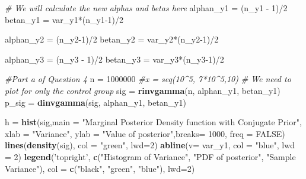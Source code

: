 \documentclass[]{article}
\newenvironment{Shaded}{\begin{snugshade}}{\end{snugshade}}
\newcommand{\KeywordTok}[1]{\textcolor[rgb]{0.13,0.29,0.53}{\textbf{{#1}}}}
\newcommand{\DataTypeTok}[1]{\textcolor[rgb]{0.13,0.29,0.53}{{#1}}}
\newcommand{\DecValTok}[1]{\textcolor[rgb]{0.00,0.00,0.81}{{#1}}}
\newcommand{\StringTok}[1]{\textcolor[rgb]{0.31,0.60,0.02}{{#1}}}
\newcommand{\CommentTok}[1]{\textcolor[rgb]{0.56,0.35,0.01}{\textit{{#1}}}}
\newcommand{\OtherTok}[1]{\textcolor[rgb]{0.56,0.35,0.01}{{#1}}}
\newcommand{\NormalTok}[1]{{#1}}
\begin{document}
\begin{Shaded}
\begin{Highlighting}[]
\CommentTok{# We will calculate the new alphas and betas here}
\NormalTok{alphan_y1 =}\StringTok{ }\NormalTok{(n_y1 -}\StringTok{ }\DecValTok{1}\NormalTok{)/}\DecValTok{2}
\NormalTok{betan_y1 =}\StringTok{ }\NormalTok{var_y1*(n_y1}\DecValTok{-1}\NormalTok{)/}\DecValTok{2}

\NormalTok{alphan_y2 =}\StringTok{ }\NormalTok{(n_y2}\DecValTok{-1}\NormalTok{)/}\DecValTok{2}
\NormalTok{betan_y2 =}\StringTok{ }\NormalTok{var_y2*(n_y2}\DecValTok{-1}\NormalTok{)/}\DecValTok{2}

\NormalTok{alphan_y3 =}\StringTok{ }\NormalTok{(n_y3 -}\StringTok{ }\DecValTok{1}\NormalTok{)/}\DecValTok{2}
\NormalTok{betan_y3 =}\StringTok{ }\NormalTok{var_y3*(n_y3}\DecValTok{-1}\NormalTok{)/}\DecValTok{2}

\CommentTok{#Part a of Question 4}
\NormalTok{n =}\StringTok{ }\DecValTok{1000000}
\CommentTok{#x = seq(10^5, 7*10^5,10)}
\CommentTok{# We need to plot for only the control group}
\NormalTok{sig =}\StringTok{ }\KeywordTok{rinvgamma}\NormalTok{(n, alphan_y1, betan_y1)}
\NormalTok{p_sig =}\StringTok{ }\KeywordTok{dinvgamma}\NormalTok{(sig, alphan_y1, betan_y1)}

\NormalTok{h =}\StringTok{ }\KeywordTok{hist}\NormalTok{(sig,}\DataTypeTok{main =} \StringTok{"Marginal Posterior Density function with Conjugate Prior"}\NormalTok{, }\DataTypeTok{xlab =} \StringTok{"Variance"}\NormalTok{, }\DataTypeTok{ylab =} \StringTok{"Value of posterior"}\NormalTok{,}\DataTypeTok{breaks=} \DecValTok{1000}\NormalTok{, }\DataTypeTok{freq =} \OtherTok{FALSE}\NormalTok{)}
\KeywordTok{lines}\NormalTok{(}\KeywordTok{density}\NormalTok{(sig), }\DataTypeTok{col =} \StringTok{"green"}\NormalTok{, }\DataTypeTok{lwd=}\DecValTok{2}\NormalTok{)}
\KeywordTok{abline}\NormalTok{(}\DataTypeTok{v=} \NormalTok{var_y1, }\DataTypeTok{col =} \StringTok{"blue"}\NormalTok{, }\DataTypeTok{lwd =} \DecValTok{2}\NormalTok{)}
\KeywordTok{legend}\NormalTok{(}\StringTok{'topright'}\NormalTok{, }\KeywordTok{c}\NormalTok{(}\StringTok{"Histogram of Variance"}\NormalTok{, }\StringTok{"PDF of posterior"}\NormalTok{, }\StringTok{"Sample Variance"}\NormalTok{), }\DataTypeTok{col =} \KeywordTok{c}\NormalTok{(}\StringTok{"black"}\NormalTok{, }\StringTok{"green"}\NormalTok{, }\StringTok{"blue"}\NormalTok{), }\DataTypeTok{lwd=}\DecValTok{2}\NormalTok{)}
\end{Highlighting}
\end{Shaded}
\end{document}
